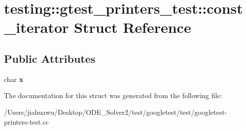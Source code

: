 \hypertarget{structtesting_1_1gtest__printers__test_1_1const__iterator}{}\section{testing\+:\+:gtest\+\_\+printers\+\_\+test\+:\+:const\+\_\+iterator Struct Reference}
\label{structtesting_1_1gtest__printers__test_1_1const__iterator}
\subsection*{Public Attributes}
\begin{DoxyCompactItemize}
\item 
\mbox{\label{structtesting_1_1gtest__printers__test_1_1const__iterator_a4412dbc1c37c2bc5211971f0c8176d6b}} 
char {\bfseries x}
\end{DoxyCompactItemize}


The documentation for this struct was generated from the following file\+:\begin{DoxyCompactItemize}
\item 
/\+Users/jiahuawu/\+Desktop/\+O\+D\+E\+\_\+\+Solver2/test/googletest/test/googletest-\/printers-\/test.\+cc\end{DoxyCompactItemize}
